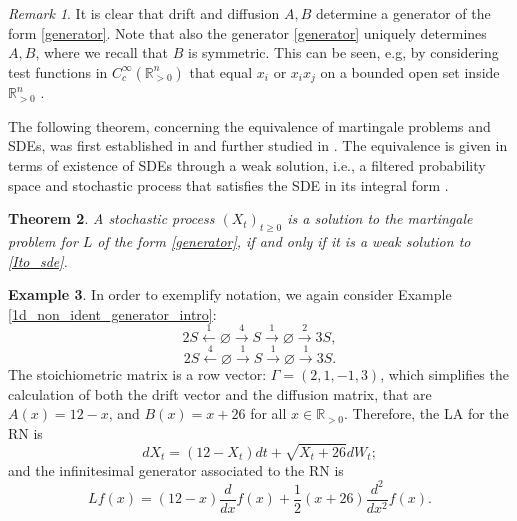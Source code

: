 \documentclass[10pt,a4paper]{amsart}
\let\emptyset\varnothing
\newtheorem{theorem}{Theorem}[section]
\theoremstyle{definition}
\newtheorem{example}[theorem]{Example}
\theoremstyle{remark}
\newtheorem{remark}[theorem]{Remark}
\theoremstyle{consequence}
\def\R{\mathbb{R}}
\numberwithin{equation}{section}
\begin{document}
\begin{remark}\label{gen_unique_AB} It is clear that drift and diffusion $A,B$ determine a generator of the form \eqref{generator}. Note that also the generator \eqref{generator} uniquely determines $A,B$, where we recall that $B$ is symmetric. This can be seen, e.g, by considering test functions in $C_c^{\infty} (\R_{> 0}^n)$ that equal $x_i$ or $x_ix_j$ on a bounded open set inside $\R_{> 0}^n$ \cite{ethier1986markov}.
\end{remark}

The following theorem, concerning the equivalence of martingale problems and SDEs, was first established in \cite{stroock1972support} and further studied in \cite{Kurtz2011EquivalenceOS}. The equivalence is given in terms of existence of SDEs through a weak solution, i.e., a filtered probability space and stochastic process that satisfies the SDE in its integral form \cite[Section 5.5]{oksendal2013stochastic}.

\begin{theorem}\label{thm_eqv-sde-mp}
  A stochastic process $(X_t)_{t \geq 0}$ is a solution to the martingale problem for $L$ of the form \eqref{generator}, if and only if it is a weak solution to \eqref{Ito_sde}.
\end{theorem}


    \begin{example}\label{1d_non_ident_generator}
In order to exemplify notation, we again consider Example \ref{1d_non_ident_generator_intro}:
$$2S\xleftarrow{1}\emptyset\xrightarrow{4}S\xrightarrow{1} \emptyset\xrightarrow{2}3S , $$
$$2S\xleftarrow{4}\emptyset\xrightarrow{1}S \xrightarrow{1} \emptyset\xrightarrow{1}3S .$$
The stoichiometric matrix is a row vector: $\Gamma = (
    2,1,-1,3)$, which simplifies the calculation of both the drift vector and the diffusion matrix, that are
$A(x)=12-x$, and $ B(x)=x+26$ for all $x \in \R_{>0}$. Therefore, the LA for the RN is
\[
  d X_t = (12 - X_t) dt + \sqrt{X_t + 26} d W_t; 
\]
and the
 infinitesimal generator associated to the RN is
\[
  L f(x) = (12 - x) \frac{d}{d x} f(x) + \frac{1}{2} (x + 26) \frac{d^2}{d x^2} f(x).
\]
\end{example}
\end{document}
